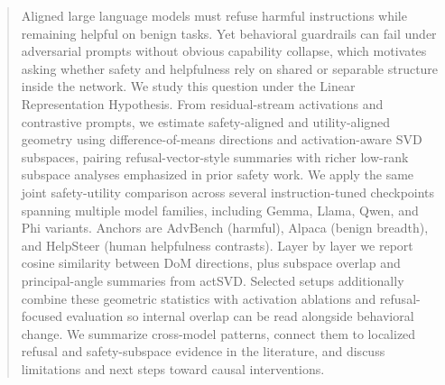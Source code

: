 \begin{abstract}
Aligned large language models must refuse harmful instructions while remaining helpful on benign tasks.
Yet behavioral guardrails can fail under adversarial prompts without obvious capability collapse, which motivates asking whether safety and helpfulness rely on shared or separable structure inside the network.
We study this question under the Linear Representation Hypothesis.
From residual-stream activations and contrastive prompts, we estimate safety-aligned and utility-aligned geometry using difference-of-means directions and activation-aware SVD subspaces, pairing refusal-vector-style summaries with richer low-rank subspace analyses emphasized in prior safety work.
We apply the same joint safety-utility comparison across several instruction-tuned checkpoints spanning multiple model families, including Gemma, Llama, Qwen, and Phi variants.
Anchors are AdvBench (harmful), Alpaca (benign breadth), and HelpSteer (human helpfulness contrasts).
Layer by layer we report cosine similarity between DoM directions, plus subspace overlap and principal-angle summaries from actSVD.
Selected setups additionally combine these geometric statistics with activation ablations and refusal-focused evaluation so internal overlap can be read alongside behavioral change.
We summarize cross-model patterns, connect them to localized refusal and safety-subspace evidence in the literature, and discuss limitations and next steps toward causal interventions.
\end{abstract}
